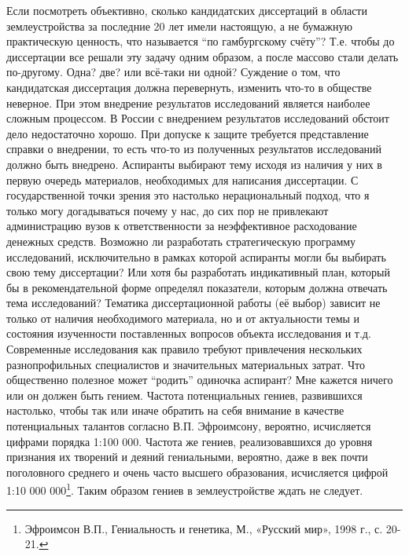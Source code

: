\begin{drama}
	\maxspeaks  Если посмотреть объективно, сколько кандидатских диссертаций в области землеустройства за последние 20 лет имели настоящую, а не бумажную практическую ценность, что называется “по гамбургскому счёту”? Т.е. чтобы до диссертации все решали эту задачу одним образом, а после массово стали делать по-другому. Одна? две? или всё-таки ни одной? 
	\michaelspeaks Суждение о том, что кандидатская диссертация должна перевернуть, изменить что-то в обществе неверное. При этом внедрение результатов исследований является наиболее сложным процессом. В России с внедрением результатов исследований обстоит дело недостаточно хорошо. При допуске к защите требуется представление справки о внедрении, то есть что-то из полученных результатов исследований должно быть внедрено.
	\maxspeaks Аспиранты выбирают тему исходя из наличия у них в первую очередь материалов, необходимых для написания диссертации. С государственной точки зрения это настолько нерациональный подход, что я только могу догадываться почему у нас, до сих пор не привлекают администрацию вузов к ответственности за неэффективное расходование денежных средств. Возможно ли разработать стратегическую программу исследований, исключительно в рамках которой аспиранты могли бы выбирать свою тему диссертации? Или хотя бы разработать индикативный план, который бы в рекомендательной форме определял показатели, которым должна отвечать тема исследований?
	\michaelspeaks Тематика диссертационной работы (её выбор) зависит не только от наличия необходимого материала, но и от актуальности темы и состояния изученности поставленных вопросов объекта исследования и т.д.
	\maxspeaks Современные исследования как правило требуют привлечения нескольких разнопрофильных специалистов и значительных материальных затрат. Что общественно полезное может “родить” одиночка аспирант? Мне кажется ничего или он должен быть гением. Частота потенциальных гениев, развившихся настолько, чтобы так или иначе обратить на себя внимание в качестве потенциальных талантов согласно В.П. Эфроимсону, вероятно, исчисляется цифрами порядка 1:100 000. Частота же гениев, реализовавшихся до уровня признания их творений и деяний гениальными, вероятно, даже в век почти поголовного среднего и очень часто высшего образования, исчисляется цифрой 1:10 000 000\footnote{Эфроимсон В.П., Гениальность и генетика, М., «Русский мир», 1998 г., с. 20-21.}. Таким образом гениев в землеустройстве ждать не следует. 

\end{drama}
